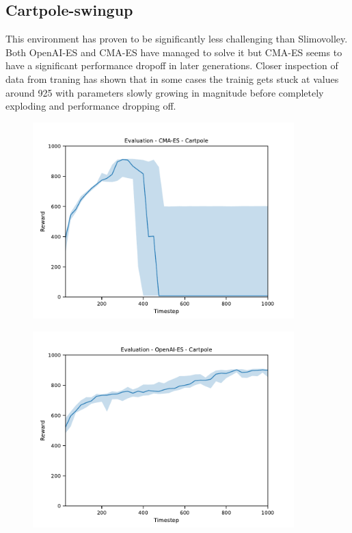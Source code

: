 \subsection{Cartpole-swingup}

This environment has proven to be significantly less challenging than Slimovolley. Both OpenAI-ES and CMA-ES have managed to solve it but CMA-ES seems to have a significant performance dropoff in later generations. Closer inspection of data from traning has shown that in some cases the trainig gets stuck at values around 925 with parameters slowly growing in magnitude before completely exploding and performance dropping off. 


\begin{figure}[H]
    \includegraphics[width=0.9\textwidth]{img/eval-cart-cmaes.pdf}
\end{figure}
\begin{figure}[H]
    \includegraphics[width=0.9\textwidth]{img/eval-cart-open.pdf}
\end{figure}
